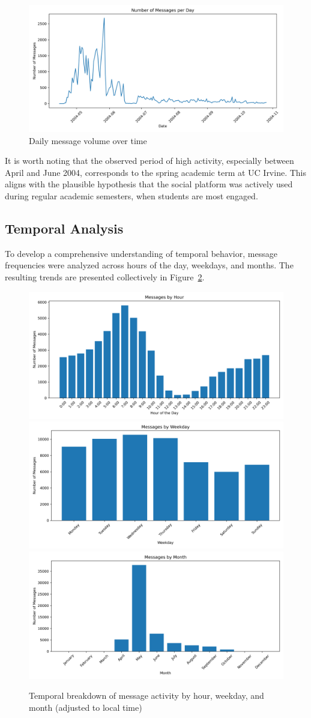 \begin{figure}[H]
    \centering
    \includegraphics[width=0.5\linewidth]{../Images/messages_per_day.png}
    \caption{Daily message volume over time}
    \label{fig:messages-per-day}
\end{figure}

It is worth noting that the observed period of high activity, especially between April and June 2004, corresponds to the spring academic term at UC Irvine. This aligns with the plausible hypothesis that the social platform was actively used during regular academic semesters, when students are most engaged.

\subsection{Temporal Analysis}

To develop a comprehensive understanding of temporal behavior, message frequencies were analyzed across hours of the day, weekdays, and months. The resulting trends are presented collectively in Figure~\ref{fig:temporal-analysis}.

\begin{figure}[H]
    \centering
    \includegraphics[width=0.3\linewidth]{../Images/messages_by_hourWrong.png}
    \includegraphics[width=0.3\linewidth]{../Images/messages_by_weekday.png}
    \includegraphics[width=0.3\linewidth]{../Images/messages_by_month.png}
    \caption{Temporal breakdown of message activity by hour, weekday, and month (adjusted to local time)}
    \label{fig:temporal-analysis}
\end{figure}

